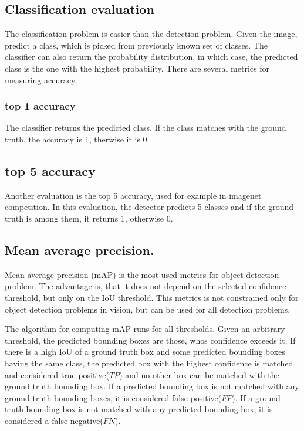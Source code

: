 \documentclass[a4paper,12pt,titlepage, twoside]{article}
\numberwithin{figure}{section}
\begin{document}
\subsection{Classification evaluation}

The classification problem is easier than the detection problem. Given the image, predict a class, which is picked from previously known set of classes. The classifier can also return the probability distribution, in which case, the predicted class is the one with the highest probability. There are several metrics for measuring accuracy.

\subsubsection{top 1 accuracy}

The classifier returns the predicted class. If the class matches with the ground truth, the accuracy is 1, therwise it is 0.

\subsection{top 5 accuracy}

Another evaluation is the top 5 accuracy, used for example in imagenet \cite{imagenet} competition. In this evaluation, the detector predicts 5 classes and if the ground truth is among them, it returns 1, otherwise 0. 

\subsection{Mean average precision.}
Mean average precision (mAP) is the most used metrics for object detection problem. The advantage is, that it does not depend on the selected confidence threshold, but only on the IoU threshold. This metrics is not constrained only for object detection problems in vision, but can be used for all detection problems. 

The algorithm for computing mAP runs for all thresholds. Given an arbitrary threshold, the predicted bounding boxes are those, whos confidence exceeds it. If there is a high IoU of a ground truth box and some predicted bounding boxes having the same class, the predicted box with the highest confidence is matched and considered true positive($TP$) and no other box can be matched with the ground truth bounding box. If a predicted bounding box is not matched with any ground truth bounding boxes, it is considered false positive($FP$). If a ground truth bounding box is not matched with any predicted bounding box, it is considered a false negative($FN$).
\end{document}
